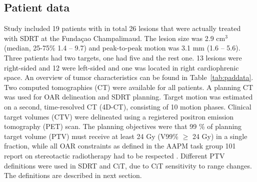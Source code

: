 \documentclass[type=dr, dr=rernat, acm$^3$entcolor=tud7b,colorbacktitle, bigchapter, openright, twoside, 12pt ]{tudthesis}
\begin{document}
\subsection{Patient data}

Study included 19 patients with in total 26 lesions that were actually treated with SDRT at the Funda\c{c}ao Champalimaud. The lesion size was 2.9 cm$^3$ (median, 25-75\% 1.4 – 9.7) and peak-to-peak motion was 3.1 mm (1.6 – 5.6).
Three patients had two targets, one had five and the rest one. 13 lesions were right-sided and 12 were left-sided and one was located in right cardiophrenic space. An overview of tumor characteristics can be found in Table~\ref{tab:paddata}.
Two computed tomographies (CT) were available for all patients. A planning CT was used for OAR delineation and SDRT planning. Target motion was estimated on a second, time-resolved CT (4D-CT), consisting of 10 motion phases. 
Clinical target volumes (CTV) were delineated using a registered positron emission tomography (PET) scan. The planning objectives were that 99 \% of planning target volume (PTV) must receive at least 24 Gy (V99\% $\geq$ 24 Gy) 
in a single fraction, while all OAR constraints as defined in the AAPM task group 101 report on stereotactic radiotherapy had to be respected \cite{Benedict2010}. Different PTV definitions were used in SDRT and CiT, due to CiT sensitivity
to range changes. The definitions are described in next section.
\end{document}
